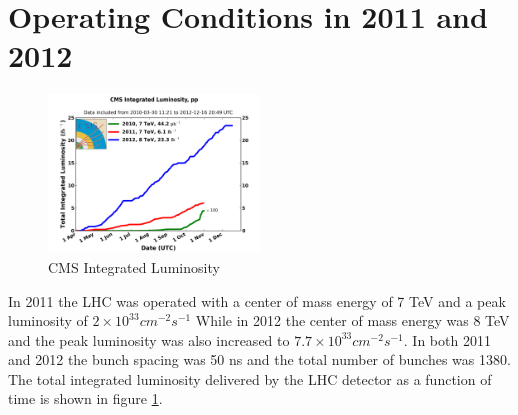 \section{Operating Conditions in 2011 and 2012}
\label{sec:Conditions}
\begin{figure}[hb]
  \centering
	\includegraphics[width=0.5\textwidth]{images/int_lumi_cumulative_pp_2.png}
  	\caption[Total Integrated Luminosity]
   	{CMS Integrated Luminosity}
	\label{fig:deliveredLumi}
\end{figure}
In 2011 the LHC was operated with a center of mass energy of 7 TeV
and a peak luminosity of $2\times10^{33} cm^{-2}s^{-1}$ 
While in 2012 the center of mass energy was 8 TeV and the peak luminosity
was also increased to $7.7\times10^{33} cm^{-2}s^{-1}$.
In both 2011 and 2012 the bunch spacing was 50 ns and the
total number of bunches was 1380. 
The total integrated luminosity delivered by the LHC detector
as a function of time is shown in figure \ref{fig:deliveredLumi}.


%
